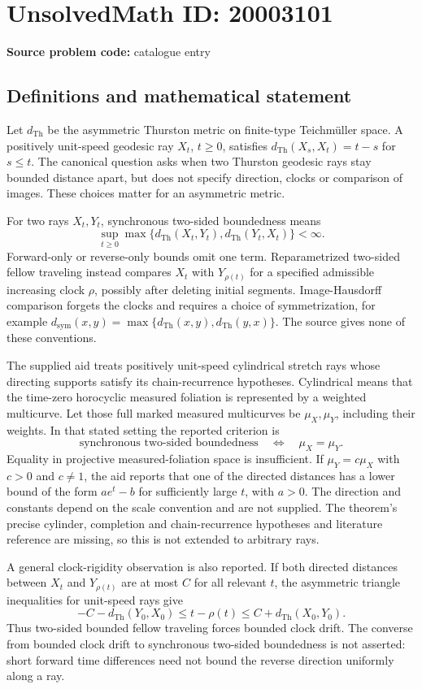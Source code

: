 \documentclass[11pt]{article}
\begin{document}
\section*{UnsolvedMath ID: 20003101}
\textbf{Source problem code:} catalogue entry
\subsection{Definitions and mathematical statement}
Let $d_{\mathrm{Th}}$ be the asymmetric Thurston metric on finite-type Teichm\"uller space. A positively unit-speed geodesic ray $X_t$, $t\geq0$, satisfies $d_{\mathrm{Th}}(X_s,X_t)=t-s$ for $s\leq t$. The canonical question asks when two Thurston geodesic rays stay bounded distance apart, but does not specify direction, clocks or comparison of images. These choices matter for an asymmetric metric.

For two rays $X_t,Y_t$, synchronous two-sided boundedness means
\[
 \sup_{t\geq0}\max\{d_{\mathrm{Th}}(X_t,Y_t),
                         d_{\mathrm{Th}}(Y_t,X_t)\}<\infty.
\]
Forward-only or reverse-only bounds omit one term. Reparametrized two-sided fellow traveling instead compares $X_t$ with $Y_{\rho(t)}$ for a specified admissible increasing clock $\rho$, possibly after deleting initial segments. Image-Hausdorff comparison forgets the clocks and requires a choice of symmetrization, for example $d_{\mathrm{sym}}(x,y)=\max\{d_{\mathrm{Th}}(x,y),d_{\mathrm{Th}}(y,x)\}$. The source gives none of these conventions.

The supplied aid treats positively unit-speed cylindrical stretch rays whose directing supports satisfy its chain-recurrence hypotheses. Cylindrical means that the time-zero horocyclic measured foliation is represented by a weighted multicurve. Let those full marked measured multicurves be $\mu_X,\mu_Y$, including their weights. In that stated setting the reported criterion is
\[
 \text{synchronous two-sided boundedness}
 \quad\Longleftrightarrow\quad\mu_X=\mu_Y.
\]
Equality in projective measured-foliation space is insufficient. If $\mu_Y=c\mu_X$ with $c>0$ and $c\ne1$, the aid reports that one of the directed distances has a lower bound of the form $a e^t-b$ for sufficiently large $t$, with $a>0$. The direction and constants depend on the scale convention and are not supplied. The theorem's precise cylinder, completion and chain-recurrence hypotheses and literature reference are missing, so this is not extended to arbitrary rays.

A general clock-rigidity observation is also reported. If both directed distances between $X_t$ and $Y_{\rho(t)}$ are at most $C$ for all relevant $t$, the asymmetric triangle inequalities for unit-speed rays give
\[
 -C-d_{\mathrm{Th}}(Y_0,X_0)
 \leq t-\rho(t)
 \leq C+d_{\mathrm{Th}}(X_0,Y_0).
\]
Thus two-sided bounded fellow traveling forces bounded clock drift. The converse from bounded clock drift to synchronous two-sided boundedness is not asserted: short forward time differences need not bound the reverse direction uniformly along a ray.
\end{document}
